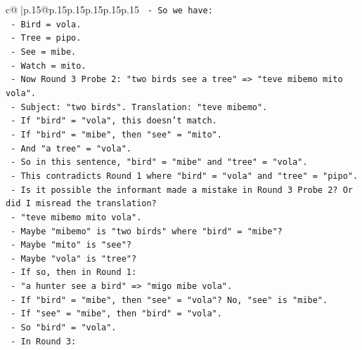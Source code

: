 \documentclass{article}
\begin{document}
{\begin{supertabular}{c@{$\;$}|p{.15\linewidth}@{}p{.15\linewidth}p{.15\linewidth}p{.15\linewidth}p{.15\linewidth}p{.15\linewidth}}
{{{\texttt{                    {-} So we have:} \\
\texttt{                      {-} Bird = vola.} \\
\texttt{                      {-} Tree = pipo.} \\
\texttt{                      {-} See = mibe.} \\
\texttt{                      {-} Watch = mito.} \\
\texttt{                    {-} Now Round 3 Probe 2: "two birds see a tree" => "teve mibemo mito vola".} \\
\texttt{                      {-} Subject: "two birds". Translation: "teve mibemo".} \\
\texttt{                      {-} If "bird" = "vola", this doesn't match.} \\
\texttt{                      {-} If "bird" = "mibe", then "see" = "mito".} \\
\texttt{                      {-} And "a tree" = "vola".} \\
\texttt{                      {-} So in this sentence, "bird" = "mibe" and "tree" = "vola".} \\
\texttt{                      {-} This contradicts Round 1 where "bird" = "vola" and "tree" = "pipo".} \\
\texttt{                      {-} Is it possible the informant made a mistake in Round 3 Probe 2? Or did I misread the translation?} \\
\texttt{                      {-} "teve mibemo mito vola".} \\
\texttt{                      {-} Maybe "mibemo" is "two birds" where "bird" = "mibe"?} \\
\texttt{                      {-} Maybe "mito" is "see"?} \\
\texttt{                      {-} Maybe "vola" is "tree"?} \\
\texttt{                      {-} If so, then in Round 1:} \\
\texttt{                        {-} "a hunter see a bird" => "migo mibe vola".} \\
\texttt{                          {-} If "bird" = "mibe", then "see" = "vola"? No, "see" is "mibe".} \\
\texttt{                          {-} If "see" = "mibe", then "bird" = "vola".} \\
\texttt{                          {-} So "bird" = "vola".} \\
\texttt{                      {-} In Round 3:} \\
}}}
\end{supertabular}}
\end{document}
